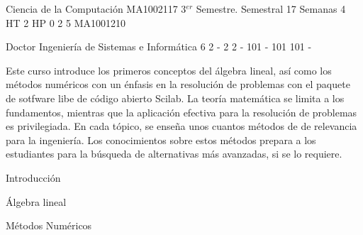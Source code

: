 \documentclass[a4paper,8pt]{article}
\begin{document}
\setNombreProfesor{}
\setGradoProfesorAbreviado{}
\sylabusHeader

\academicaTable
{Ciencia de la Computación} %
{MA1002117} %
{3$^{er}$ Semestre.} %
{Semestral} %
{17 Semanas} %
{4 HT} %
{2 HP} %
{0} %
{}  %
{2} %
{5} %
{MA1001210} %

\administrativaTable
{Doctor} %
{Ingeniería de Sistemas e Informática} %
{6} %
{2} %
{-} %
{2} %
{2} %
{-} %
{101} %
{-} %
{101} %
{101} %
{-} %


\begin{fundamentacion}
Este curso introduce los primeros conceptos del álgebra lineal, así como los métodos numéricos con un énfasis en la resolución de problemas
con el paquete de sotfware libe de código abierto Scilab.
La teoría matemática se limita a los fundamentos, mientras que la aplicación efectiva para la resolución de problemas es privilegiada. 
En cada tópico, se enseña unos cuantos métodos de de relevancia para la ingeniería. 
Los conocimientos sobre estos métodos prepara a los estudiantes para la búsqueda de alternativas más avanzadas, si se lo requiere.

\end{fundamentacion}

\begin{sumilla}
\item Introducción
\item Álgebra lineal
\item Métodos Numéricos

\end{sumilla}

\begin{competenciasAsignatura}
\item {}
\item {}
\item {}

\end{competenciasAsignatura}
\end{document}
